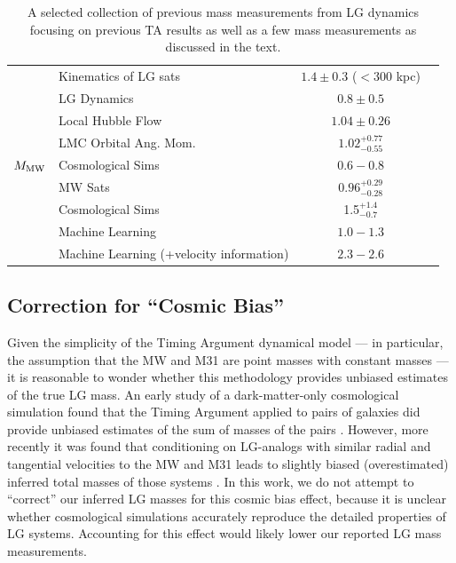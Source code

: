 \documentclass[twocolumn]{aastex631}
\newcommand{\mmw}{\ensuremath{M_{\rm MW}}}
\begin{document}
\begin{table}
\begin{tabular}{clc|c}
    \hline
    \multirow{9}{*}{\mmw}&  Kinematics of LG sats & $1.4 \pm 0.3$ ($<$300 kpc)
    & \citealt{Watkins2010}\\
    & LG Dynamics &$0.8\pm0.5$ & \citealt{Diaz2014}\\
    & Local Hubble Flow & $1.04 \pm 0.26$ & \citealt{Penarrubia2016}\\
    & LMC Orbital Ang. Mom. & $1.02^{+0.77}_{-0.55}$ & \citealt{Patel2017b}\\
    & Cosmological Sims & $0.6-0.8$ & \citealt{Carlesi2017}\\
    & MW Sats & $0.96^{+0.29}_{-0.28}$ & \citealt{Patel2018}\\
    & Cosmological Sims & 1.5$^{+1.4}_{-0.7}$ & \citealt{Zhai2020} \\
    & Machine Learning & $1.0-1.3$ & \citealt{Villanueva-Domingo2021}\\
    & Machine Learning (+velocity information) & $2.3-2.6$ &
    \citealt{Villanueva-Domingo2021}\\
  \hline\hline
  \end{tabular}
  \caption{\label{table:masses}A selected collection of previous mass
  measurements from LG dynamics focusing on previous TA results as well as a few
  mass measurements as discussed in the text.}
\end{table}


\subsection{Correction for ``Cosmic Bias''}
Given the simplicity of the Timing Argument dynamical model --- in particular,
the assumption that the MW and M31 are point masses with constant masses --- it
is reasonable to wonder whether this methodology provides unbiased estimates of
the true LG mass.
An early study of a dark-matter-only cosmological simulation found that the
Timing Argument applied to pairs of galaxies did provide unbiased estimates of
the sum of masses of the pairs \citep{LiWhite2008}.
However, more recently it was found that conditioning on LG-analogs with similar
radial and tangential velocities to the MW and M31 leads to slightly biased
(overestimated) inferred total masses of those systems \citep{Gonzalez2014,
Hartl2021}.
In this work, we do not attempt to ``correct'' our inferred LG masses for this
cosmic bias effect, because it is unclear whether cosmological simulations
accurately reproduce the detailed properties of LG systems.
Accounting for this effect would likely lower our reported LG mass measurements.
\end{document}
